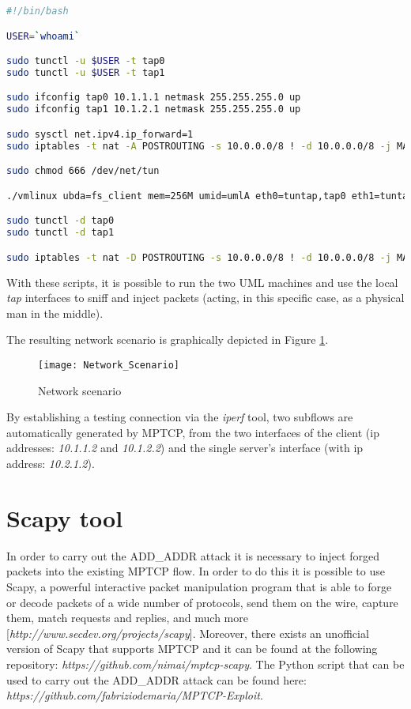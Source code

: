 \begin{lstlisting}[language=bash, caption=\textit{client.sh}]
#!/bin/bash

USER=`whoami`

sudo tunctl -u $USER -t tap0
sudo tunctl -u $USER -t tap1

sudo ifconfig tap0 10.1.1.1 netmask 255.255.255.0 up
sudo ifconfig tap1 10.1.2.1 netmask 255.255.255.0 up

sudo sysctl net.ipv4.ip_forward=1
sudo iptables -t nat -A POSTROUTING -s 10.0.0.0/8 ! -d 10.0.0.0/8 -j MASQUERADE

sudo chmod 666 /dev/net/tun

./vmlinux ubda=fs_client mem=256M umid=umlA eth0=tuntap,tap0 eth1=tuntap,tap1

sudo tunctl -d tap0
sudo tunctl -d tap1

sudo iptables -t nat -D POSTROUTING -s 10.0.0.0/8 ! -d 10.0.0.0/8 -j MASQUERADE
\end{lstlisting}

With these scripts, it is possible to run the two UML machines and use the local \textit{tap} interfaces to sniff and inject packets (acting, in this specific case, as a physical man in the middle).

The resulting network scenario is graphically depicted in Figure \ref{fig:networkscenario}.

\begin{figure}[!htb]
\centering
\texttt{[image: Network\_Scenario]}
\caption{Network scenario}
\label{fig:networkscenario}
\end{figure}

By establishing a testing connection via the \textit{iperf} tool, two subflows are automatically generated by MPTCP, from the two interfaces of the client (ip addresses: \textit{10.1.1.2} and \textit{10.1.2.2}) and the single server's interface (with ip address: \textit{10.2.1.2}).

\section{Scapy tool}
In order to carry out the ADD\_ADDR attack it is necessary to inject forged packets into the existing MPTCP flow. In order to do this it is possible to use Scapy, a powerful interactive packet manipulation program that is able to forge or decode packets of a wide number of protocols, send them on the wire, capture them, match requests and replies, and much more [\textit{http://www.secdev.org/projects/scapy}]. Moreover, there exists an unofficial version of Scapy that supports MPTCP and it can be found at the following repository: \textit{https://github.com/nimai/mptcp-scapy}. The Python script that can be used to carry out the ADD\_ADDR attack can be found here: \textit{https://github.com/fabriziodemaria/MPTCP-Exploit}. 

